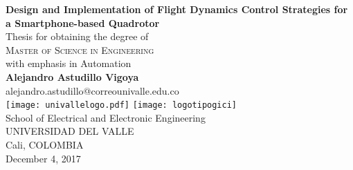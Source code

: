 \begin{titlepage}
\begin{center}
 {\LARGE\bfseries Design and Implementation of Flight Dynamics Control Strategies for a Smartphone-based Quadrotor\\}
 \vspace{2.5cm}
{Thesis for obtaining the degree of} \\[2cm]
\textsc{\Large{{Master of Science in Engineering}}} \\[5pt]
{\large  with emphasis in Automation} \\[2pt]
 \vfill
 \vspace{0.5cm}
 \vspace{1.5cm}
 {\Large\bfseries Alejandro Astudillo Vigoya}\\[5pt]
 alejandro.astudillo@correounivalle.edu.co\\[14pt]
 \vspace{1.5cm}
\texttt{[image: univallelogo.pdf]}
\texttt{[image: logotipogici]}
\\[35pt]
{School of Electrical and Electronic Engineering}\\[5pt]
{UNIVERSIDAD DEL VALLE}\\[5pt]
{Cali, COLOMBIA}\\
 \vfill
 \vspace{0.5cm}
{December 4, 2017}

\end{center}
\end{titlepage}

\setcounter{page}{2} 

\newpage
\thispagestyle{empty}
\mbox{}


